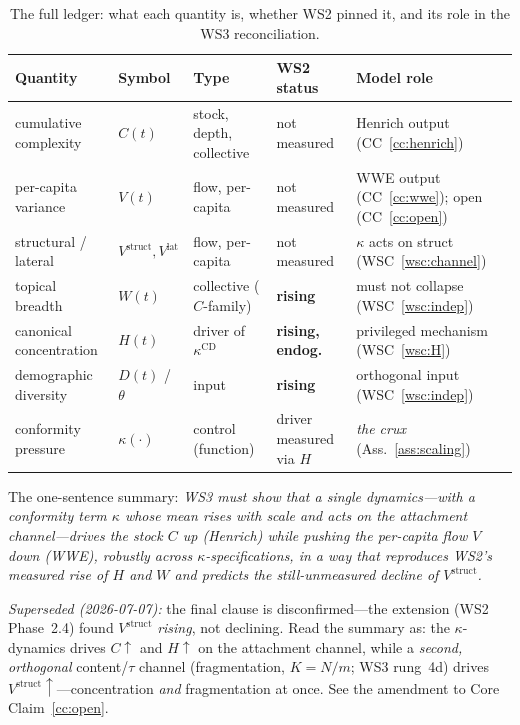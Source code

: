 \documentclass[11pt,letterpaper]{article}
\theoremstyle{definition}
\theoremstyle{plain}
\begin{document}
\begin{table}[h]
\centering
\small
\begin{tabular}{@{}p{2.9cm} l p{2.7cm} l p{3.4cm}@{}}
\toprule
Quantity & Symbol & Type & WS2 status & Model role \\
\midrule
cumulative complexity & $C(t)$ & stock, depth, collective & not measured & Henrich output (CC~\ref{cc:henrich}) \\
per-capita variance & $V(t)$ & flow, per-capita & not measured & WWE output (CC~\ref{cc:wwe}); open (CC~\ref{cc:open}) \\
\;\; structural / lateral & $V^{\mathrm{struct}},V^{\mathrm{lat}}$ & flow, per-capita & not measured & $\kappa$ acts on struct (WSC~\ref{wsc:channel}) \\
topical breadth & $W(t)$ & collective ($C$-family) & \textbf{rising} & must not collapse (WSC~\ref{wsc:indep}) \\
canonical concentration & $H(t)$ & driver of $\kappa^{\mathrm{CD}}$ & \textbf{rising, endog.} & privileged mechanism (WSC~\ref{wsc:H}) \\
demographic diversity & $D(t)$ / $\theta$ & input & \textbf{rising} & orthogonal input (WSC~\ref{wsc:indep}) \\
conformity pressure & $\kappa(\cdot)$ & control (function) & driver measured via $H$ & \emph{the crux} (Ass.~\ref{ass:scaling}) \\
\bottomrule
\end{tabular}
\caption{The full ledger: what each quantity is, whether WS2 pinned it, and its
role in the WS3 reconciliation.}
\label{tab:ledger}
\end{table}

The one-sentence summary: \emph{WS3 must show that a single dynamics---with a
conformity term $\kappa$ whose mean rises with scale and acts on the attachment
channel---drives the stock $C$ up (Henrich) while pushing the per-capita flow $V$
down (WWE), robustly across $\kappa$-specifications, in a way that reproduces
WS2's measured rise of $H$ and $W$ and predicts the still-unmeasured decline of
$V^{\mathrm{struct}}$.}

\smallskip\noindent\emph{Superseded (2026-07-07):} the final clause is disconfirmed---the
extension (WS2 Phase~2.4) found $V^{\mathrm{struct}}$ \emph{rising}, not declining. Read the
summary as: the $\kappa$-dynamics drives $C\!\uparrow$ and $H\!\uparrow$ on the attachment
channel, while a \emph{second, orthogonal} content/$\tau$ channel (fragmentation, $K=N/m$;
WS3 rung~4d) drives $V^{\mathrm{struct}}\!\uparrow$---concentration \emph{and} fragmentation
at once. See the amendment to Core Claim~\ref{cc:open}.
\end{document}
